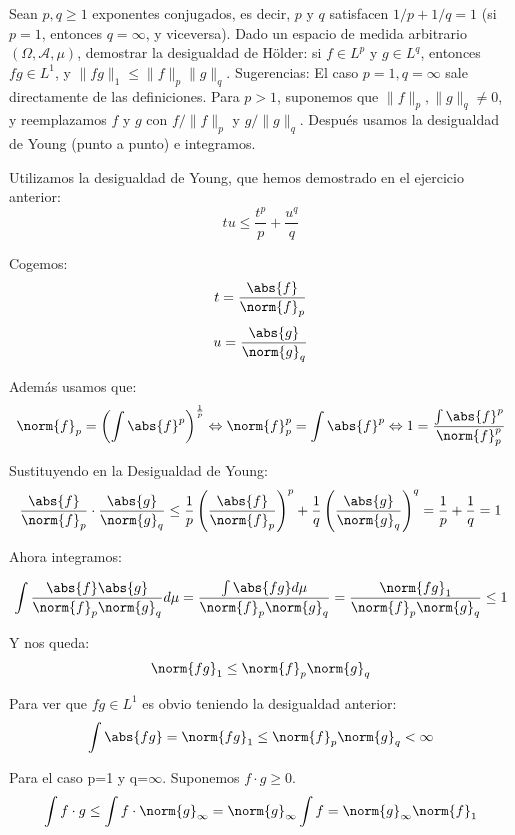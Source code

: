 \begin{problem}[3] Sean $p,q \ge 1$ exponentes conjugados, es decir, $p$ y $q$ satisfacen
$1/p + 1/q =1$ (si $p=1$, entonces $q = \infty$, y viceversa).
Dado un espacio de medida arbitrario $(\Omega, \mathcal{A}, \mu)$, demostrar la desigualdad de
H\"older: si $f\in L^p$ y $g\in L^q$, entonces $fg\in L^1$, y $\|fg\|_1 \le \|f\|_p\|g\|_q$.
Sugerencias: El caso $p=1, q=\infty$ sale directamente de las definiciones.
Para $p >1$, suponemos que  $\|f\|_p, \|g\|_q\ne 0$, y reemplazamos 
$f$ y $g$ con 
 $f/\|f\|_p$ y $g/\|g\|_q$.  Despu\'es usamos la desigualdad de Young (punto a
punto) e integramos.
\solution

\begin{expla}
Utilizamos la desigualdad de Young, que hemos demostrado en el ejercicio anterior:
\[
tu\leq\frac{t^p}{p}+\frac{u^q}{q}
\]

Cogemos:
\[
t=\frac{\abs{f}}{\norm{f}_p}
\]
\[
u=\frac{\abs{g}}{\norm{g}_q}
\]

Además usamos que:
\[
\norm{f}_p=\left( \int \abs{f}^p  \right)^\frac{1}{p}  \Leftrightarrow  \norm{f}_p^p= \int \abs{f}^p \Leftrightarrow 1 = \frac{\int \abs{f}^p}{\norm{f}_p^p}
\]
\end{expla}

Sustituyendo en la Desigualdad de Young:
\[
\frac{\abs{f}}{\norm{f}_p} \cdot \frac{\abs{g}}{\norm{g}_q} \leq \frac{1}{p}\left( \frac{\abs{f}}{\norm{f}_p} \right)^p + \frac{1}{q}\left( \frac{\abs{g}}{\norm{g}_q} \right)^q = \frac{1}{p} +  \frac{1}{q} = 1 
\]

Ahora integramos:

\[
\int \frac{\abs{f}\abs{g}}{{\norm{f}_p}{\norm{g}_q}} d\mu =
\frac{\int \abs{fg}d\mu}{{\norm{f}_p}{\norm{g}_q}} = 
\frac{{\norm{fg}_1}}{{\norm{f}_p}{\norm{g}_q}} \leq 1
\]

Y nos queda:
\[
\norm{fg}_1 \leq \norm{f}_p \norm{g}_q
\]

Para ver que $fg \in L^1$ es obvio teniendo la desigualdad anterior:
\[
\int \abs{fg} = \norm{fg}_1 \leq \norm{f}_p \norm{g}_q < \infty
\]

Para el caso p=1 y q=$\infty$. Suponemos $f\cdot g \geq 0$.
\[
\int f\cdot g \leq \int f \cdot \norm{g}_{\infty}= \norm{g}_{\infty} \int f = \norm{g}_{\infty} \norm{f}_{1}
\]

\end{problem}


